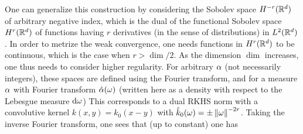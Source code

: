 \begin{example}\label{exp-sobolev-neg}
	One can generalize this construction by considering the Sobolev space $H^{-r}(\mathbb{R}^d)$ of arbitrary negative index, which is the dual of the functional Sobolev space $H^{r}(\mathbb{R}^d)$ of functions having $r$ derivatives (in the sense of distributions) in $L^2(\mathbb{R}^d)$.
	In order to metrize the weak convergence, one needs functions in $H^{r}(\mathbb{R}^d)$  to be continuous, which is the case when $r>\dim/2$. As the dimension $\dim$ increases, one thus needs to consider higher regularity.
	For arbitrary $\alpha$ (not necessarily integers), these spaces are defined using the Fourier transform, and for a measure $\alpha$ with Fourier transform $\hat {\alpha}(\omega)$ (written here as a density with respect to the Lebesgue measure $\mathrm{d}\omega$)
	This corresponds to a dual RKHS norm with a convolutive kernel $k(x,y)=k_0(x-y)$ with $\hat k_0(\omega) = \pm \left\| \omega \right\|^{-2r}$. Taking the inverse Fourier transform, one sees that (up to constant) one has
\end{example}




